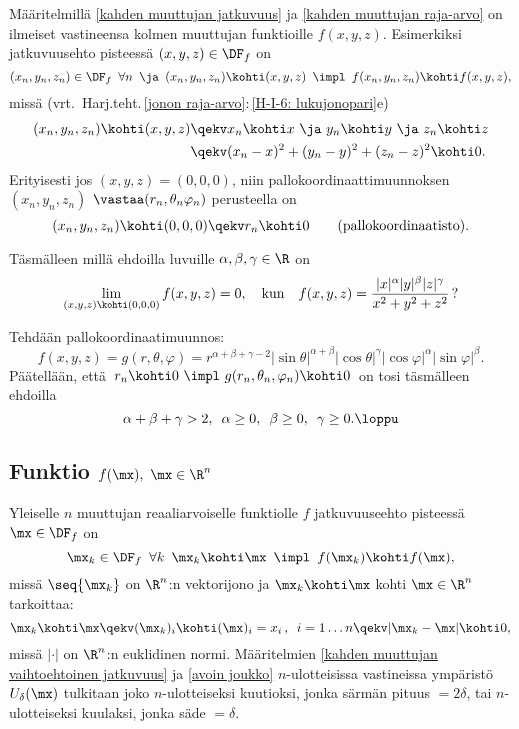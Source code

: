 Määritelmillä \ref{kahden muuttujan jatkuvuus} ja \ref{kahden muuttujan raja-arvo} on ilmeiset
vastineensa kolmen muuttujan funktioille $f(x,y,z)$. Esimerkiksi jatkuvuusehto pisteessä
$(x,y,z)\in\DF_f$ on %
\[
(x_n,y_n,z_n)\in\DF_f\,\ \forall n\,\ \ja\,\ (x_n,y_n,z_n)\kohti(x,y,z)\,\
                                      \impl\,\ f(x_n,y_n,z_n) \kohti f(x,y,z),
\]
missä (vrt.\ Harj.teht.\,\ref{jonon raja-arvo}:\,\ref{H-I-6: lukujonopari}e)
\begin{align*}
(x_n,y_n,z_n)\kohti(x,y,z) &\qekv x_n \kohti x\ \ja\ y_n \kohti y\ \ja\ z_n \kohti z \\
                           &\qekv (x_n-x)^2+(y_n-y)^2+(z_n-z)^2 \kohti 0.
\end{align*}
Erityisesti jos $(x,y,z)=(0,0,0)$, niin pallokoordinaattimuunnoksen $(x_n,y_n,z_n)$
$\vastaa(r_n,\theta_n\varphi_n)$ perusteella on
\[
(x_n,y_n,z_n)\kohti(0,0,0) \qekv r_n \kohti 0 \qquad \text{(pallokoordinaatisto)}.
\]
\begin{Exa} Täsmälleen millä ehdoilla luvuille $\alpha,\beta,\gamma\in\R$ on
\[
\lim_{(x,y,z)\kohti(0,0,0)}f(x,y,z)=0, \quad \text{kun} \quad
f(x,y,z)=\frac{|x|^\alpha|y|^\beta|z|^\gamma}{x^2+y^2+z^2}\,?
\]
\end{Exa}
\ratk Tehdään pallokoordinaatimuunnos:
\[
f(x,y,z) = g(r,\theta,\varphi) = r^{\alpha+\beta+\gamma-2}|
                                 \sin\theta|^{\alpha+\beta}|\cos\theta|^\gamma
                                 |\cos\varphi|^\alpha|\sin\varphi|^\beta.
\]
Päätellään, että $\,r_n \kohti 0\ \impl\ g(r_n,\theta_n,\varphi_n) \kohti 0\,$ on tosi
täsmälleen ehdoilla
\[
\alpha+\beta+\gamma > 2,\,\ \alpha \ge 0,\,\ \beta \ge 0,\,\ \gamma \ge 0. \loppu
\]

\subsection{Funktio $f(\mx),\  \mx\in\R^n$}

Yleiselle $n$ muuttujan reaaliarvoiselle funktiolle $f$ jatkuvuuseehto pisteessä
$\mx\in\DF_f$ on
%
\[
\mx_k\in\DF_f\,\ \forall k\,\ \mx_k \kohti \mx\,\ \impl\,\ f(\mx_k) \kohti f(\mx),
\]
missä $\seq{\mx_k}$ on $\R^n$:n vektorijono ja \kor{suppeneminen} $\mx_k \kohti \mx$ kohti
\kor{raja-arvoa} $\mx\in\R^n$ tarkoittaa:
\[
\mx_k \kohti \mx \qekv (\mx_k)_i \kohti (\mx)_i=x_i\,,\,\ i=1 \ldots n
                 \qekv |\mx_k-\mx| \kohti 0,
\]
missä $|\cdot|$ on $\R^n$:n euklidinen normi. Määritelmien
\ref{kahden muuttujan vaihtoehtoinen jatkuvuus} ja \ref{avoin joukko} $n$-ulotteisissa
vastineissa ympäristö $U_\delta(\mx)$ tulkitaan joko $n$-ulotteiseksi kuutioksi, jonka särmän
pituus $=2\delta$, tai $n$-ulotteiseksi kuulaksi, jonka säde $=\delta$.

